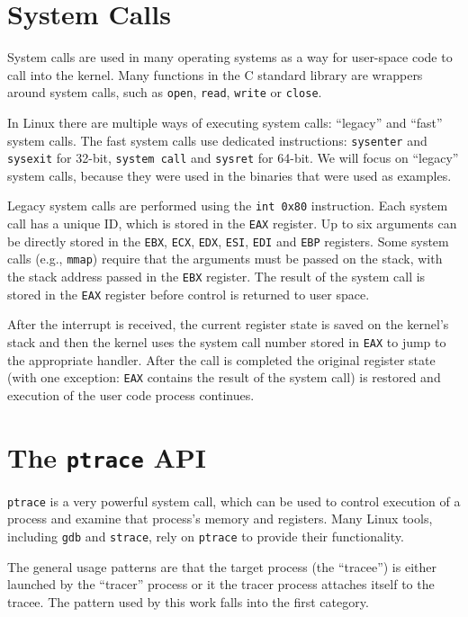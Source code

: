 \documentclass[draft,final]{vutinfth} %
\begin{document}
\section{System Calls}
\label{system calls}

System calls are used in many operating systems as a way for user-space code to call into the kernel. Many functions in the C standard library are wrappers around system calls, such as \texttt{open}, \texttt{read}, \texttt{write} or \texttt{close}.

In Linux there are multiple ways of executing system calls\cite[Chapter 10]{UnderstandingKernel}: ``legacy'' and ``fast'' system calls. The fast system calls use dedicated instructions: \texttt{sysenter} and \texttt{sysexit} for 32-bit, \texttt{system call} and \texttt{sysret} for 64-bit. We will focus on ``legacy'' system calls, because they were used in the binaries that were used as examples.

Legacy system calls are performed using the \texttt{int 0x80} instruction. Each system call has a unique ID, which is stored in the \texttt{EAX} register. Up to six arguments can be directly stored in the \texttt{EBX}, \texttt{ECX}, \texttt{EDX}, \texttt{ESI}, \texttt{EDI} and \texttt{EBP} registers. Some system calls (e.g., \texttt{mmap}) require that the arguments must be passed on the stack, with the stack address passed in the \texttt{EBX} register. The result of the system call is stored in the \texttt{EAX} register before control is returned to user space.

After the interrupt is received, the current register state is saved on the kernel's stack and then the kernel uses the system call number stored in \texttt{EAX} to jump to the appropriate handler. After the call is completed the original register state (with one exception: \texttt{EAX} contains the result of the system call) is restored and execution of the user code process continues.

\section{The \texttt{ptrace} API}
\label{ptrace api}

\texttt{ptrace} is a very powerful system call, which can be used to control execution of a process and examine that process's memory and registers. Many Linux tools, including \texttt{gdb} and \texttt{strace}, rely on \texttt{ptrace} to provide their functionality.

The general usage patterns are that the target process (the ``tracee'') is either launched by the ``tracer'' process or it the tracer process attaches itself to the tracee. The pattern used by this work falls into the first category.
\end{document}
